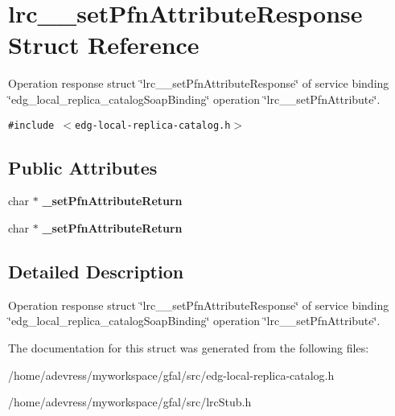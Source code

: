 \section{lrc\_\-\_\-set\-Pfn\-Attribute\-Response Struct Reference}
\label{structlrc____setPfnAttributeResponse}
Operation response struct \char`\"{}lrc\_\-\_\-set\-Pfn\-Attribute\-Response\char`\"{} of service binding \char`\"{}edg\_\-local\_\-replica\_\-catalog\-Soap\-Binding\char`\"{} operation \char`\"{}lrc\_\-\_\-set\-Pfn\-Attribute\char`\"{}.  


{\tt \#include $<$edg-local-replica-catalog.h$>$}

\subsection*{Public Attributes}
\begin{CompactItemize}
\item 
char $\ast$ \textbf{\_\-set\-Pfn\-Attribute\-Return}\label{structlrc____setPfnAttributeResponse_b04f406205c9ca378490ff5553381c20}

\item 
char $\ast$ \textbf{\_\-set\-Pfn\-Attribute\-Return}\label{structlrc____setPfnAttributeResponse_b04f406205c9ca378490ff5553381c20}

\end{CompactItemize}


\subsection{Detailed Description}
Operation response struct \char`\"{}lrc\_\-\_\-set\-Pfn\-Attribute\-Response\char`\"{} of service binding \char`\"{}edg\_\-local\_\-replica\_\-catalog\-Soap\-Binding\char`\"{} operation \char`\"{}lrc\_\-\_\-set\-Pfn\-Attribute\char`\"{}. 



The documentation for this struct was generated from the following files:\begin{CompactItemize}
\item 
/home/adevress/myworkspace/gfal/src/edg-local-replica-catalog.h\item 
/home/adevress/myworkspace/gfal/src/lrc\-Stub.h\end{CompactItemize}
